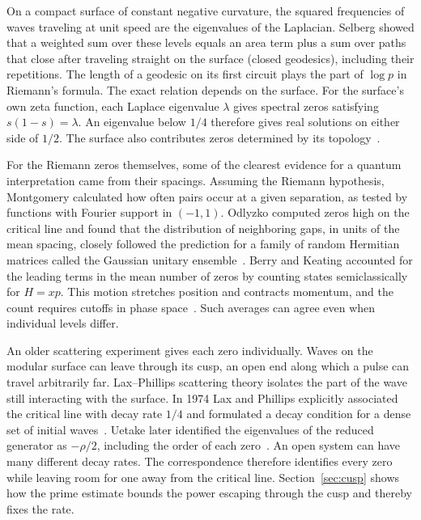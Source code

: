 \documentclass[11pt,letterpaper]{article}
\numberwithin{equation}{section}
\begin{document}
On a compact surface of constant negative curvature, the squared frequencies of
waves traveling at unit speed are the eigenvalues of the Laplacian. Selberg showed
that a weighted sum over these levels equals an area term plus a sum over paths
that close after traveling straight on the surface (closed geodesics), including
their repetitions. The length of a geodesic on its first circuit plays the part of
$\log p$ in Riemann's formula. The exact relation depends on the surface. For the surface's own zeta function, each Laplace eigenvalue $\lambda$ gives spectral zeros satisfying $s(1-s)=\lambda$. An eigenvalue below $1/4$ therefore gives real solutions on either side of $1/2$. The surface also contributes zeros determined by its topology~\cite{selberg}.

For the Riemann zeros themselves, some of the clearest evidence for a quantum
interpretation came from their spacings. Assuming the Riemann hypothesis,
Montgomery calculated how often pairs occur at a given separation, as tested by
functions with Fourier support in $(-1,1)$. Odlyzko computed zeros high on the
critical line and found that the distribution of neighboring gaps, in units of the
mean spacing, closely followed the prediction for a family of random Hermitian
matrices called the Gaussian unitary ensemble~\cite{montgomery,odlyzko}. Berry and
Keating accounted for the leading terms in the mean number of zeros by counting
states semiclassically for $H=xp$. This motion stretches position and contracts
momentum, and the count requires cutoffs in phase space~\cite{berry}. Such averages
can agree even when individual levels differ.

An older scattering experiment gives each zero individually. Waves on the modular
surface can leave through its cusp, an open end along which a pulse can travel
arbitrarily far. Lax--Phillips scattering theory isolates the part of the wave
still interacting with the surface. In 1974 Lax and Phillips explicitly associated the critical line with decay rate $1/4$ and formulated a decay condition for a dense set of initial waves~\cite{laxphillips}. Uetake later identified the eigenvalues of the
reduced generator as $-\rho/2$, including the order of each zero~\cite{uetake}.
An open system can have many different decay rates. The correspondence therefore
identifies every zero while leaving room for one away from the critical line.
Section~\ref{sec:cusp} shows how the prime estimate bounds the power escaping
through the cusp and thereby fixes the rate.
\end{document}
